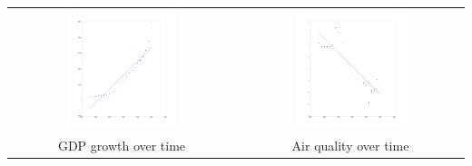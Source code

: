 \documentclass[11pt]{article}
\begin{document}
\begin{tabular}{cc}
  \includegraphics[width=0.5\textwidth]{img/growth_gdp}
& \includegraphics[width=0.5\textwidth]{img/air_quality}\\
   GDP growth over time & Air quality over time 
\end{tabular}
\end{document}

